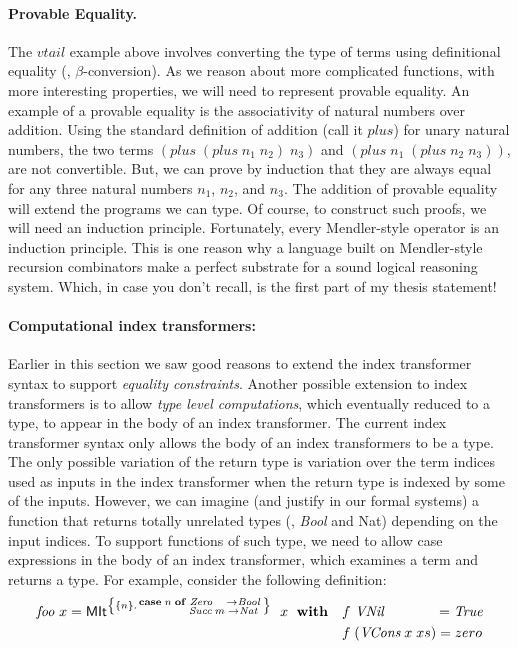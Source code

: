 \paragraph{Provable Equality.}
The $vtail$ example above involves converting the type of terms using
definitional equality (\ie, $\beta$-conversion). As we reason about more
complicated functions, with more interesting properties, we will need to
represent provable equality. An example of a provable equality is
the associativity of natural numbers over addition. Using the standard
definition of addition (call it $plus$) for unary natural numbers, the two terms
$(plus\;(plus\;n_1\;n_2)\;n_3)$ and $(plus\;n_1\;(plus\;n_2\;n_3))$,
are not convertible. But, we can prove by induction that they are always equal
for any three natural numbers $n_1$, $n_2$, and $n_3$. The addition of
provable equality will extend the programs we can type. Of course,
to construct such proofs, we will need an induction principle. Fortunately,
every Mendler-style operator is an induction principle. This is one reason
why a language built on Mendler-style recursion combinators make a perfect
substrate for a sound logical reasoning system. Which, in case you don't recall,
is the first part of my thesis statement!





\paragraph{Computational index transformers:}
Earlier in this section we saw good reasons to extend
the index transformer syntax to support \emph{equality constraints}.
Another possible extension to index transformers is to allow
\emph{type level computations}, which eventually reduced to a type,
to appear in the body of an index transformer. The current index
transformer syntax only allows the body of an index transformers to be a type.
The only possible variation of the return type is variation over
the term indices used as inputs in the index transformer
when the return type is indexed by some of the inputs. However, we can imagine
(and justify in our formal systems) 
a function that returns totally unrelated types (\eg, \textit{Bool} and Nat)
depending on the input indices. To support functions of such type, we need
to allow case expressions in the body of an index transformer, which examines
a term and returns a type. For example, consider the following definition:
\begin{align*}
\textit{foo}~x =
 \textsf{MIt}^{\left\{\{n\} . \begin{smallmatrix}\textbf{case}\;n\;\textbf{of}
                                        &\textit{Zero}~~~  -> \textit{Bool} \\
                                        &\textit{Succ}\;m\;-> \textit{Nat}\;
                                        \end{smallmatrix}
       \right\}}~\;x~\;\textbf{with}
&\quad  f ~\textit{VNil}~~~~~~~~~~~ = \textit{True} \\
&\quad  f \;(\textit{VCons}\;x\;xs) = zero
\end{align*}

